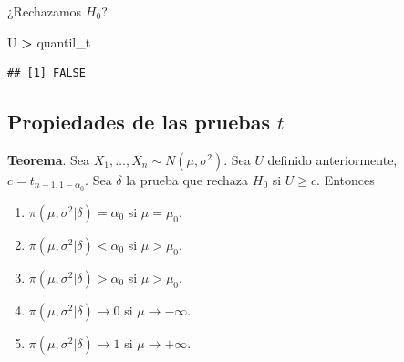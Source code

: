 \documentclass[
  12pt,
]{book}
\newenvironment{Shaded}{\begin{snugshade}}{\end{snugshade}}
\newcommand{\DataTypeTok}[1]{\textcolor[rgb]{0.13,0.29,0.53}{#1}}
\newcommand{\DecValTok}[1]{\textcolor[rgb]{0.00,0.00,0.81}{#1}}
\newcommand{\FloatTok}[1]{\textcolor[rgb]{0.00,0.00,0.81}{#1}}
\newcommand{\KeywordTok}[1]{\textcolor[rgb]{0.13,0.29,0.53}{\textbf{#1}}}
\newcommand{\NormalTok}[1]{#1}
\newcommand{\OperatorTok}[1]{\textcolor[rgb]{0.81,0.36,0.00}{\textbf{#1}}}
\newcommand{\StringTok}[1]{\textcolor[rgb]{0.31,0.60,0.02}{#1}}
\begin{document}
\begin{Shaded}
\end{Shaded}

¿Rechazamos \(H_0\)?

\begin{Shaded}
\begin{Highlighting}[]
\NormalTok{U }\OperatorTok{\textgreater{}}\StringTok{ }\NormalTok{quantil\_t}
\end{Highlighting}
\end{Shaded}

\begin{verbatim}
## [1] FALSE
\end{verbatim}

\hypertarget{propiedades-de-las-pruebas-t}{%
\subsection{\texorpdfstring{Propiedades de las pruebas \(t\)}{Propiedades de las pruebas t}}\label{propiedades-de-las-pruebas-t}}

\textbf{Teorema}. Sea \(X_1,\dots,X_n\sim N(\mu,\sigma^2)\). Sea \(U\) definido
anteriormente, \(c=t_{n-1,1-\alpha_0}\). Sea \(\delta\) la prueba que rechaza \(H_0\)
si \(U\geq c\). Entonces

\begin{enumerate}
\def\labelenumi{\roman{enumi})}
\item
  \(\pi(\mu,\sigma^2|\delta) = \alpha_0\) si \(\mu=\mu_0\).
\item
  \(\pi(\mu,\sigma^2|\delta) < \alpha_0\) si \(\mu>\mu_0\).
\item
  \(\pi(\mu,\sigma^2|\delta) >\alpha_0\) si \(\mu>\mu_0\).
\item
  \(\pi(\mu,\sigma^2|\delta) \to 0\) si \(\mu\to-\infty\).
\item
  \(\pi(\mu,\sigma^2|\delta) \to 1\) si \(\mu\to+\infty\).
\end{enumerate}
\end{document}
